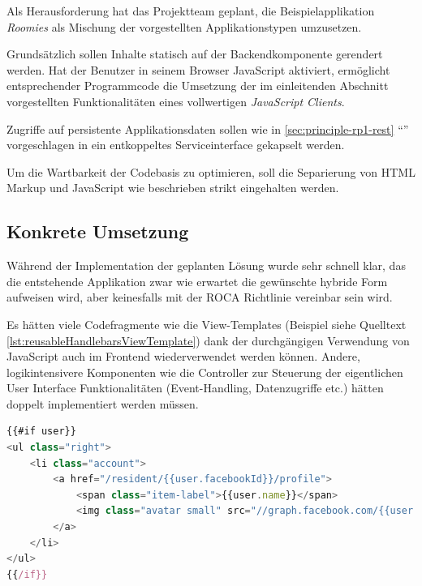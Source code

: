 Als Herausforderung hat das Projektteam geplant, die Beispielapplikation \emph{Roomies} als Mischung der vorgestellten Applikationstypen umzusetzen.

Grundsätzlich sollen Inhalte statisch auf der Backendkomponente gerendert werden. Hat der Benutzer in seinem Browser JavaScript aktiviert, ermöglicht entsprechender Programmcode die Umsetzung der im einleitenden Abschnitt vorgestellten Funktionalitäten eines vollwertigen \emph{JavaScript Clients}.

Zugriffe auf persistente Applikationsdaten sollen wie in \ref{sec:principle-rp1-rest} ``'' vorgeschlagen in ein entkoppeltes Serviceinterface gekapselt werden.

Um die Wartbarkeit der Codebasis zu optimieren, soll die Separierung von HTML Markup und JavaScript wie beschrieben strikt eingehalten werden.


\subsection*{Konkrete Umsetzung}

Während der Implementation der geplanten Lösung wurde sehr schnell klar, das die entstehende Applikation zwar wie erwartet die gewünschte hybride Form aufweisen wird, aber keinesfalls mit der ROCA Richtlinie \emph{} vereinbar sein wird.

Es hätten viele Codefragmente wie die View-Templates (Beispiel siehe Quelltext \ref{lst:reusableHandlebarsViewTemplate}) dank der durchgängigen Verwendung von JavaScript auch im Frontend wiederverwendet werden können. Andere, logikintensivere Komponenten wie die Controller zur Steuerung der eigentlichen User Interface Funktionalitäten (Event-Handling, Datenzugriffe etc.) hätten doppelt implementiert werden müssen.

\begin{lstlisting}[language=JavaScript, firstnumber=31, caption={Ausschnitt aus dem \emph{Handlebars} \cite{Handlebars} Template zur Darstellung von Benutzerinformation in der Menüleiste von \emph{Roomies} \cite{roomiesMenuTemplate}}, label={lst:reusableHandlebarsViewTemplate}]
{{#if user}}
<ul class="right">
	<li class="account">
		<a href="/resident/{{user.facebookId}}/profile">
			<span class="item-label">{{user.name}}</span>
			<img class="avatar small" src="//graph.facebook.com/{{user.facebookId}}/picture" />
		</a>
	</li>
</ul>
{{/if}}
\end{lstlisting}

